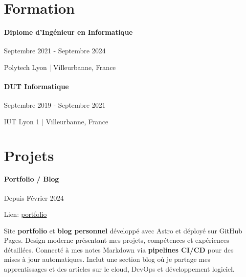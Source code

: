 \documentclass{article}
\begin{document}
\vspace{2ex}
\hrulefill
\section*{Formation}
\paragraph{Diplome d'Ingénieur en Informatique}\hspace*{\fill}Septembre 2021 - Septembre 2024

Polytech Lyon | Villeurbanne, France


\paragraph{DUT Informatique}\hspace*{\fill}Septembre 2019 - Septembre 2021

IUT Lyon 1 | Villeurbanne, France

\vspace{2ex}
\hrulefill
\section*{Projets}

\paragraph{Portfolio / Blog} \hspace*{\fill}Depuis Février 2024

Lien: \href{https://issamsisbane.github.io/portfolio/fr/}{\underline{portfolio}}

\vspace{\baselineskip}

Site \textbf{portfolio} et \textbf{blog personnel} développé avec Astro et déployé sur GitHub Pages. Design moderne présentant mes projets, compétences et expériences détaillées. Connecté à mes notes Markdown via \textbf{pipelines CI/CD} pour des mises à jour automatiques. Inclut une section blog où je partage mes apprentissages et des articles sur le cloud, DevOps et développement logiciel.
\end{document}
